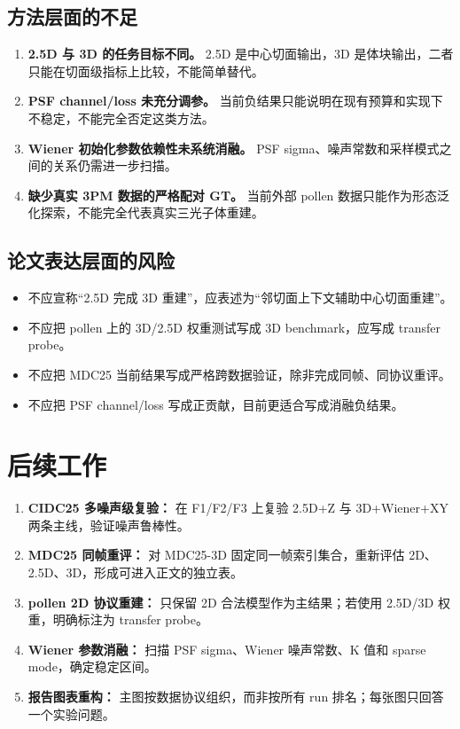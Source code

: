 \documentclass[UTF8, scheme=plain, 11pt, a4paper]{ctexart}
\begin{document}
\subsection{方法层面的不足}

\begin{enumerate}[leftmargin=*]
  \item \textbf{2.5D 与 3D 的任务目标不同。} 2.5D 是中心切面输出，3D 是体块输出，二者只能在切面级指标上比较，不能简单替代。
  \item \textbf{PSF channel/loss 未充分调参。} 当前负结果只能说明在现有预算和实现下不稳定，不能完全否定这类方法。
  \item \textbf{Wiener 初始化参数依赖性未系统消融。} PSF sigma、噪声常数和采样模式之间的关系仍需进一步扫描。
  \item \textbf{缺少真实 3PM 数据的严格配对 GT。} 当前外部 pollen 数据只能作为形态泛化探索，不能完全代表真实三光子体重建。
\end{enumerate}

\subsection{论文表达层面的风险}

\begin{itemize}[leftmargin=*]
  \item 不应宣称“2.5D 完成 3D 重建”，应表述为“邻切面上下文辅助中心切面重建”。
  \item 不应把 pollen 上的 3D/2.5D 权重测试写成 3D benchmark，应写成 transfer probe。
  \item 不应把 MDC25 当前结果写成严格跨数据验证，除非完成同帧、同协议重评。
  \item 不应把 PSF channel/loss 写成正贡献，目前更适合写成消融负结果。
\end{itemize}

\section{后续工作}

\begin{enumerate}[leftmargin=*]
  \item \textbf{CIDC25 多噪声级复验：} 在 F1/F2/F3 上复验 2.5D+Z 与 3D+Wiener+XY 两条主线，验证噪声鲁棒性。
  \item \textbf{MDC25 同帧重评：} 对 MDC25-3D 固定同一帧索引集合，重新评估 2D、2.5D、3D，形成可进入正文的独立表。
  \item \textbf{pollen 2D 协议重建：} 只保留 2D 合法模型作为主结果；若使用 2.5D/3D 权重，明确标注为 transfer probe。
  \item \textbf{Wiener 参数消融：} 扫描 PSF sigma、Wiener 噪声常数、K 值和 sparse mode，确定稳定区间。
  \item \textbf{报告图表重构：} 主图按数据协议组织，而非按所有 run 排名；每张图只回答一个实验问题。
\end{enumerate}
\end{document}
